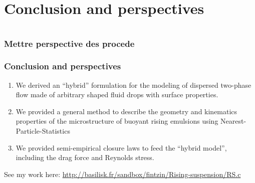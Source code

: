 \documentclass{sintefbeamer}
\begin{document}
\section{Conclusion and perspectives}
\section*{}

\begin{frame}
  \frametitle{Mettre perspective des procede}

  

\end{frame}

\begin{frame}
  \frametitle{Conclusion and perspectives}

  \begin{enumerate}
    \item We derived an ``hybrid'' formulation for the  modeling of dispersed two-phase flow made of arbitrary shaped fluid drops with surface properties. 
    \item We provided a general method to describe the  geometry and kinematics   properties of the microstructure of buoyant rising emulsions using Nearest-Particle-Statistics
    \item We provided semi-empirical closure laws to feed the ``hybrid model'',  including the drag force and Reynolds stress. 
  \end{enumerate}
\vfill    
See my work here: \url{http://basilisk.fr/sandbox/fintzin/Rising-suspension/RS.c}

\end{frame}


 
\end{document}
